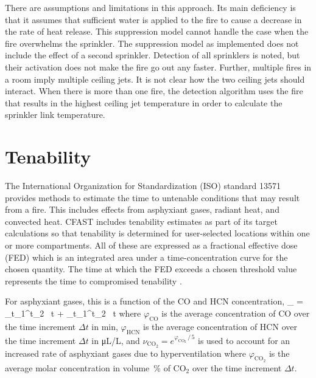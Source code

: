\documentclass[12pt,twoside]{book}
\begin{document}
There are assumptions and limitations in this approach. Its main deficiency is that it assumes that sufficient water is applied to the fire to cause a decrease in the rate of heat release. This suppression model cannot handle the case when the fire overwhelms the sprinkler.  The suppression model as implemented does not include the effect of a second sprinkler. Detection of all sprinklers is noted, but their activation does not make the fire go out any faster. Further, multiple fires in a room imply multiple ceiling jets. It is not clear how the two ceiling jets should interact. When there is more than one fire, the detection algorithm uses the fire that results in the highest ceiling jet temperature in order to calculate the sprinkler link temperature.


\section{Tenability} \label{sec:Tenability}

The International Organization for Standardization (ISO) standard 13571 \cite{ISO:13571} provides methods to estimate the time to untenable conditions that may result from a fire.  This includes effects from asphyxiant gases, radiant heat, and convected heat. CFAST includes tenability estimates as part of its target calculations so that tenability is determined for user-selected locations within one or more compartments. All of these are expressed as a fractional effective dose (FED) which is an integrated area under a time-concentration curve for the chosen quantity. The time at which the FED exceeds a chosen threshold value represents the time to compromised tenability \cite{ISO:13571}.

For asphyxiant gases, this is a function of the CO and HCN concentration,
\be
    \chi_{\FED} = \sum\limits_{t_1}^{t_2}  \, \Delta t + \sum\limits_{t_1}^{t_2}  \, \Delta t
\ee
where $\varphi_{\mathrm{CO}}$ is the average concentration of CO over the time increment $\Delta t$ in min, $\varphi_{\mathrm{HCN}}$ is the average concentration of HCN over the time increment $\Delta t$ in \unit{\micro\liter/\liter}, and $\nu_{\mathrm{CO_2}} = e^{\varphi_{\mathrm{CO_2}} \, / \, 5}$ is used to account for an increased rate of asphyxiant gases due to hyperventilation where $\varphi_{\mathrm{CO_2}}$ is the average molar concentration in volume \,\% of $\mathrm{CO_2}$ over the time increment $\Delta t$.
\end{document}
